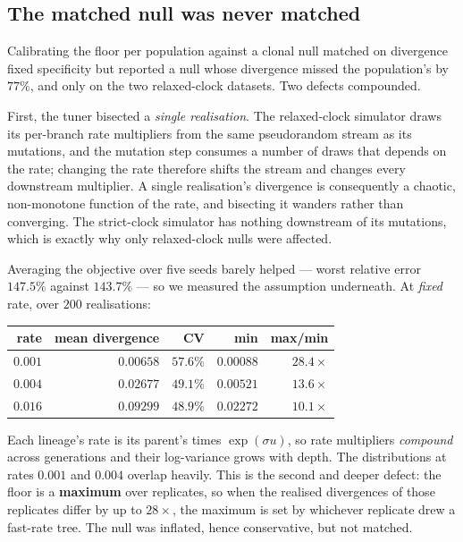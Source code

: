 \documentclass[11pt,a4paper]{article}
\theoremstyle{definition}
\theoremstyle{remark}
\begin{document}
\subsection{The matched null was never matched}\label{sec:nullmatching}

Calibrating the floor per population against a clonal null matched on divergence
fixed specificity but reported a null whose divergence missed the population's by
$77\%$, and only on the two relaxed-clock datasets. Two defects compounded.

First, the tuner bisected a \emph{single realisation}. The relaxed-clock
simulator draws its per-branch rate multipliers from the same pseudorandom stream
as its mutations, and the mutation step consumes a number of draws that depends
on the rate; changing the rate therefore shifts the stream and changes every
downstream multiplier. A single realisation's divergence is consequently a
chaotic, non-monotone function of the rate, and bisecting it wanders rather than
converging. The strict-clock simulator has nothing downstream of its mutations,
which is exactly why only relaxed-clock nulls were affected.

Averaging the objective over five seeds barely helped --- worst relative error
$147.5\%$ against $143.7\%$ --- so we measured the assumption underneath. At
\emph{fixed} rate, over $200$ realisations:

\begin{center}\footnotesize
\begin{tabular}{@{}rrrrr@{}}
\toprule
rate & mean divergence & CV & min & max/min \\
\midrule
$0.001$ & $0.00658$ & $57.6\%$ & $0.00088$ & $28.4\times$ \\
$0.004$ & $0.02677$ & $49.1\%$ & $0.00521$ & $13.6\times$ \\
$0.016$ & $0.09299$ & $48.9\%$ & $0.02272$ & $10.1\times$ \\
\bottomrule
\end{tabular}
\end{center}

Each lineage's rate is its parent's times $\exp(\sigma u)$, so rate multipliers
\emph{compound} across generations and their log-variance grows with depth. The
distributions at rates $0.001$ and $0.004$ overlap heavily. This is the second
and deeper defect: the floor is a \textbf{maximum} over replicates, so when the
realised divergences of those replicates differ by up to $28\times$, the maximum
is set by whichever replicate drew a fast-rate tree. The null was inflated, hence
conservative, but not matched.
\end{document}
